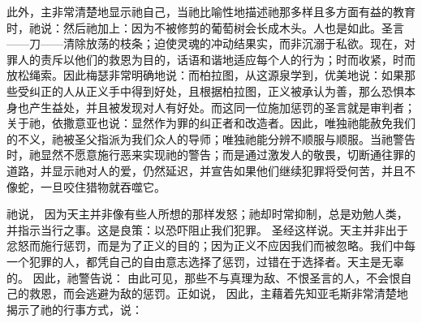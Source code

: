 此外，主非常清楚地显示祂自己，当祂比喻性地描述祂那多样且多方面有益的教育时，祂说：然后祂加上：因为不被修剪的葡萄树会长成木头。人也是如此。圣言——刀——清除放荡的枝条；迫使灵魂的冲动结果实，而非沉溺于私欲。现在，对罪人的责斥以他们的救恩为目的，话语和谐地适应每个人的行为；时而收紧，时而放松绳索。因此梅瑟非常明确地说：而柏拉图，从这源泉学到，优美地说：如果那些受纠正的人从正义手中得到好处，且根据柏拉图，正义被承认为善，那么恐惧本身也产生益处，并且被发现对人有好处。而这同一位施加惩罚的圣言就是审判者；关于祂，依撒意亚也说：显然作为罪的纠正者和改造者。因此，唯独祂能赦免我们的不义，祂被圣父指派为我们众人的导师；唯独祂能分辨不顺服与顺服。当祂警告时，祂显然不愿意施行恶来实现祂的警告；而是通过激发人的敬畏，切断通往罪的道路，并显示祂对人的爱，仍然延迟，并宣告如果他们继续犯罪将受何苦，并且不像蛇，一旦咬住猎物就吞噬它。\par

祂说， 因为天主并非像有些人所想的那样发怒；祂却时常抑制，总是劝勉人类，并指示当行之事。这是良策：以恐吓阻止我们犯罪。 圣经这样说。天主并非出于忿怒而施行惩罚，而是为了正义的目的；因为正义不应因我们而被忽略。我们中每一个犯罪的人，都凭自己的自由意志选择了惩罚，过错在于选择者。天主是无辜的。 因此，祂警告说： 由此可见，那些不与真理为敌、不恨圣言的人，不会恨自己的救恩，而会逃避为敌的惩罚。正如说， 因此，主藉着先知亚毛斯非常清楚地揭示了祂的行事方式，说： \par

